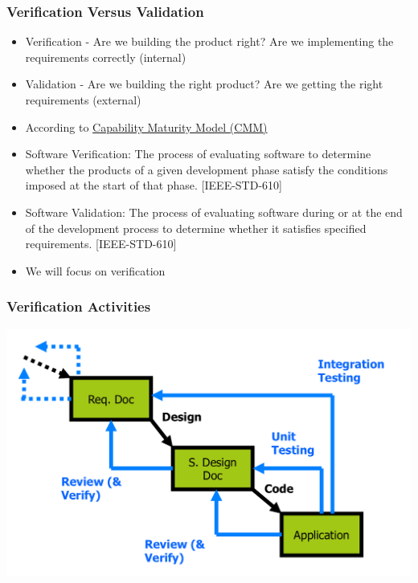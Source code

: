 \documentclass[t,12pt,numbers,fleqn]{beamer}
\begin{document}
\begin{frame}
\frametitle{Verification Versus Validation}

\begin{itemize}

\item Verification - Are we building the product right?  Are we implementing the
  requirements correctly (internal)
\item Validation - Are we building the right product? Are we getting the right
  requirements (external)
\item According to
  \href{https://en.wikipedia.org/wiki/Software_verification_and_validation}{Capability
    Maturity Model (CMM)}
\bi
\item 
    Software Verification: The process of evaluating software to determine
    whether the products of a given development phase satisfy the conditions
    imposed at the start of that phase. [IEEE-STD-610]
  \item Software Validation: The process of evaluating software during or at the
    end of the development process to determine whether it satisfies specified
    requirements. [IEEE-STD-610] 
\ei
\item We will focus on verification
\end{itemize}

\end{frame}


\begin{frame}
\frametitle{Verification Activities}

\begin{center}
\includegraphics[scale=0.55]{../Figures/SoftwareLifecycle.png}
\end{center}

\end{frame}
\end{document}
